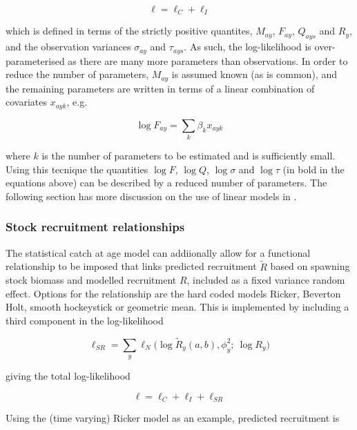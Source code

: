 \documentclass[a4paper,english,10pt]{article}\usepackage[]{graphicx}\usepackage[]{color}
\begin{document}
\begin{equation*}
  \ell = \ell_C + \ell_I
\end{equation*}

which is defined in terms of the strictly positive quantites, $M_{ay}$, $F_{ay}$, $Q_{ays}$ and $R_{y}$, and the observation variances $\sigma_{ay}$ and $\tau_{ays}$.  As such, the log-likelihood is over-parameterised as there are many more parameters than observations.  In order to reduce the number of parameters, $M_{ay}$ is assumed known (as is common), and the remaining parameters are written in terms of a linear combination of covariates $x_{ayk}$, e.g.

\begin{equation*}
  \log F_{ay} = \sum_k \beta_k x_{ayk}
\end{equation*}

where $k$ is the number of parameters to be estimated and is sufficiently small. Using this tecnique the quantities $\log F$, $\log Q$, $\log \sigma$ and $\log \tau$
(in bold in the equations above) can be described by a reduced number of parameters.  The following section has more discussion on the use of linear models in \aFa.


\subsubsection*{Stock recruitment relationships}

The \aFa statistical catch at age model can addiionally allow for a functional relationship to be imposed that links predicted recruitment $\tilde{R}$ based on spawning stock biomass and modelled recruitment $R$, included as a fixed variance random effect.  Options for the relationship are the hard coded models Ricker, Beverton Holt, smooth hockeystick or geometric mean. This is implemented by including a third component in the log-likelihood

\begin{equation*}
  \ell_{SR} = \sum_y \ell_N \Big( \log \tilde{R}_y(a, b), \phi_y^2 ;\ \log R_y \Big)
\end{equation*}

giving the total log-likelihood

\begin{equation*}
  \ell = \ell_C + \ell_I + \ell_{SR}
\end{equation*}

Using the (time varying) Ricker model as an example, predicted recruitment is
\end{document}
